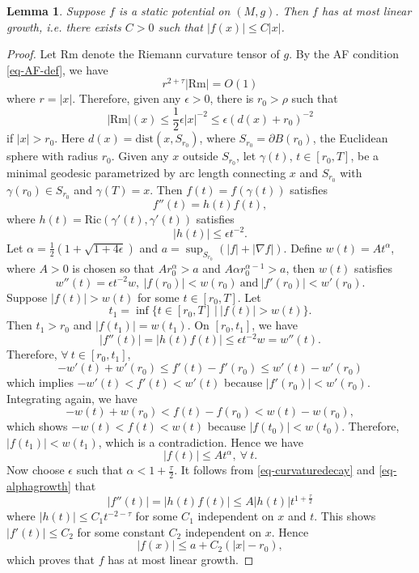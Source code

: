 \documentclass[12pt]{amsart}
\newtheorem{lma}{Lemma}[section]
\theoremstyle{remark}
\numberwithin{equation}{section}
\newcommand{\Ric}{\mbox{Ric}}
\newcommand{\be}{\begin{equation}}
\newcommand{\ee}{\end{equation}}
\def\p{\partial}
\def\Rm{\text{Rm}}
\def\dist{\text{dist}}
\def\e{\epsilon}
\def\a{\alpha}
\begin{document}
\begin{lma}\label{lma-linear-growth}
Suppose $f$ is a static potential on $(M, g)$. Then $f$ has at most linear growth,
i.e. there exists $ C > 0 $ such that $ | f (x) | \le C | x | $.
\end{lma}
\begin{proof}
Let $ \Rm$ denote the Riemann curvature tensor of $g$.
By the AF condition \eqref{eq-AF-def},
we have
\be\label{eq-curvaturedecay}
r^{2+\tau}|\Rm|=O(1)
\ee
where $ r = | x |$.
Therefore, given any  $\e>0$,  there is  $r_0>\rho$  such that
$$|\Rm|(x)\le \frac 12 \epsilon | x |^{-2} \le \e (d(x)+r_0)^{-2}$$
if  $|x|>r_0$. Here  $d(x)=\dist(x, S_{r_0} )$, where $S_{r_0}=\p B(r_0)$, the Euclidean sphere with radius $r_0$.
Given any $x$ outside $ S_{r_0}$, let $\gamma(t)$, $ t \in [r_0, T]$,  be a minimal geodesic  parametrized by arc length connecting  $x$ and $S_{r_0}$
with
 $ \gamma (r_0) \in S_{r_0} $ and $ \gamma (T) = x$.
Then $f(t)=f(\gamma(t))$ satisfies
$$ f''(t) =h(t)f(t) , $$
where $ h(t)  = \Ric (\gamma'(t), \gamma'(t) ) $ satisfies
$$|h(t)|\le \e t^{-2}. $$
Let $\a=\frac12(1+\sqrt{1+4\e})$ and $a=\sup_{S_{r_0} } (|f|+|\nabla f|)$.
Define  $w(t)= A  t^\a$, where  $A >0$ is chosen so that $ A r_0^\a>a$ and  $ A  \a r_0^{\a-1}>a$, then  $w(t)$ satisfies
$$
w'' (t) =\e t^{-2}w, \  |f (r_0) | < w (r_0)  \ \mathrm{and} \   |f' (r_0) |<w' (r_0) .
$$
Suppose $ | f (t) | > w (t) $ for some $ t \in [r_0, T]$.
Let
$$t_1=\inf  \{t\in [r_0,T] \ | \ |f (t) | >  w (t) \} .$$
Then $ t_1 > r_0 $ and $ | f(t_1) | = w(t_1)$.
 On $[r_0,t_1]$, we have
$$
|f''(t)|=|h(t)f(t)|\le \e t^{-2}w=w''(t).
$$
Therefore, $\forall \ t \in [r_0,t_1]$,
$$
-w'(t)+w'(r_0)\le f'(t)-f'(r_0)\le w'(t)-w'(r_0)
$$
which implies
$
-w'(t)<  f'(t) <w'(t)
$
because $ |f'(r_0)| < w'(r_0)$. Integrating again, we have
$$
 -w(t)+w(r_0)< f(t)-f(r_0)< w(t)-w(r_0),
$$
which shows  $ - w(t) < f(t) < w(t) $ because
$|f(t_0)|<w(t_0)$.
Therefore, $ | f (t_1) | < w(t_1) $, which is a contradiction.
Hence we have
\be \label{eq-alphagrowth}
|f(t)|\le A t^\a, \ \forall \ t .
\ee
Now  choose $\e$ such that $\a< 1+\frac\tau2 $. It follows from  \eqref{eq-curvaturedecay} and \eqref{eq-alphagrowth} that
$$ |f''(t)| =|h(t)f(t)|\le A|h(t)|t^{1+\frac\tau2}  $$
where $|h(t)|\le C_1 t^{-2-\tau}$ for some $C_1$ independent on $x$ and $t$.
This shows  $|f' (t)| \le C_2 $ for some constant  $C_2  $ independent on $ x$.
Hence
 $$ | f (x) | \le a + C_2  ( |x| - r_0 )  ,$$
which proves  that $ f $ has at most linear growth.
\end{proof}
\end{document}
